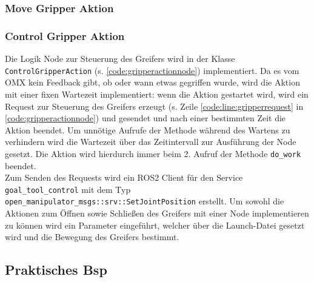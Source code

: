 \subsubsection{Move Gripper Aktion}
\subsubsection{Control Gripper Aktion}
Die Logik Node zur Steuerung des Greifers wird in der Klasse \verb|ControlGripperAction| (s. \ref{code:gripperactionnode}) implementiert. Da es vom OMX kein Feedback gibt, ob oder wann etwas gegriffen wurde, wird die Aktion mit einer fixen Wartezeit implementiert: wenn die Aktion gestartet wird, wird ein Request zur Steuerung des Greifers erzeugt (s. Zeile \ref{code:line:gripperrequest} in \ref{code:gripperactionnode}) und gesendet und nach einer bestimmten Zeit die Aktion beendet. Um unnötige Aufrufe der Methode während des Wartens zu verhindern wird die Wartezeit über das Zeitintervall zur Ausführung der Node gesetzt. Die Aktion wird hierdurch immer beim 2. Aufruf der Methode \verb|do_work| beendet.\\
Zum Senden des Requests wird ein \ac{ROS2} Client für den Service \verb|goal_tool_control| mit dem Typ \verb|open_manipulator_msgs::srv::SetJointPosition| erstellt. 
Um sowohl die Aktionen zum Öffnen sowie Schließen des Greifers mit einer Node implementieren zu können wird ein Parameter eingeführt, welcher über die Launch-Datei gesetzt wird und die Bewegung des Greifers bestimmt.
\subsection{Praktisches Bsp}

